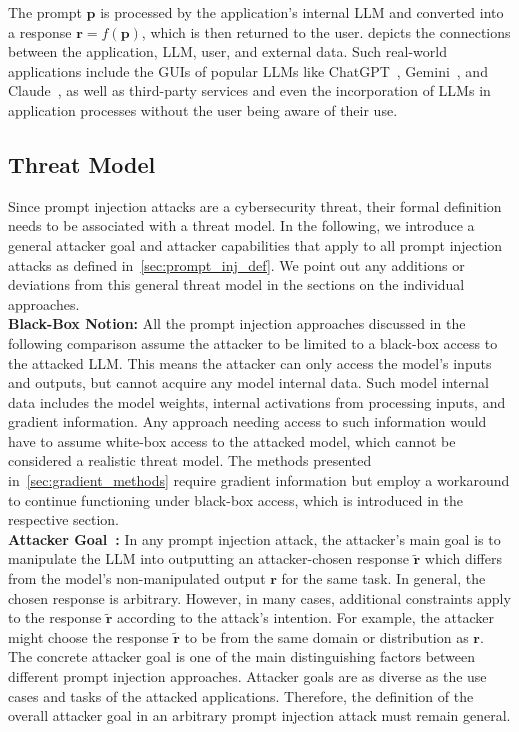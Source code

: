 The prompt $\textbf{p}$ is processed by the application's internal LLM and converted into a response $\textbf{r} = f(\textbf{p})$, which is then returned to the user.
 depicts the connections between the application, LLM, user, and external data.
Such real-world applications include the GUIs of popular LLMs like ChatGPT~\cite{openai_introducing_2022}, Gemini~\cite{google_new_2025}, and Claude~\cite{anthropic_claude_nodate}, as well as third-party services and even the incorporation of LLMs in application processes without the user being aware of their use.

\subsection{Threat Model} \label{sec:threat_model}
Since prompt injection attacks are a cybersecurity threat, their formal definition needs to be associated with a threat model.
In the following, we introduce a general attacker goal and attacker capabilities that apply to all prompt injection attacks as defined in~\cref{sec:prompt_inj_def}.
We point out any additions or deviations from this general threat model in the sections on the individual approaches.\\

\textbf{Black-Box Notion:}
All the prompt injection approaches discussed in the following comparison assume the attacker to be limited to a black-box access to the attacked LLM.
This means the attacker can only access the model's inputs and outputs, but cannot acquire any model internal data.
Such model internal data includes the model weights, internal activations from processing inputs, and gradient information.
Any approach needing access to such information would have to assume white-box access to the attacked model, which cannot be considered a realistic threat model.
The methods presented in~\cref{sec:gradient_methods} require gradient information but employ a workaround to continue functioning under black-box access, which is introduced in the respective section.\\

\textbf{Attacker Goal~\cite{liu_formalizing_2024}:}
In any prompt injection attack, the attacker's main goal is to manipulate the LLM into outputting an attacker-chosen response $\tilde{\textbf{r}}$ which differs from the model's non-manipulated output $\textbf{r}$ for the same task.
In general, the chosen response is arbitrary.
However, in many cases, additional constraints apply to the response $\tilde{\textbf{r}}$ according to the attack's intention.
For example, the attacker might choose the response $\tilde{\textbf{r}}$ to be from the same domain or distribution as $\textbf{r}$.
The concrete attacker goal is one of the main distinguishing factors between different prompt injection approaches.
Attacker goals are as diverse as the use cases and tasks of the attacked applications.
Therefore, the definition of the overall attacker goal in an arbitrary prompt injection attack must remain general.\\

